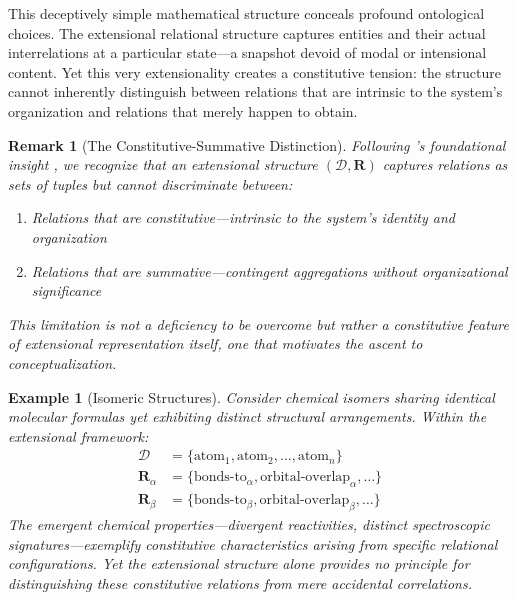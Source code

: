 \documentclass[12pt,a4paper]{article}
\newtheorem{remark}[definition]{Remark}
\newtheorem{example}[definition]{Example}
\newcommand{\domain}{\mathcal{D}}
\begin{document}
This deceptively simple mathematical structure conceals profound ontological choices. The extensional relational structure captures entities and their actual interrelations at a particular state---a snapshot devoid of modal or intensional content. Yet this very extensionality creates a constitutive tension: the structure cannot inherently distinguish between relations that are intrinsic to the system's organization and relations that merely happen to obtain.

\begin{remark}[The Constitutive-Summative Distinction]
Following \citeauthor{bertalanffy1968}'s foundational insight \citep{bertalanffy1968}, we recognize that an extensional structure $(\domain, \mathbf{R})$ captures relations as sets of tuples but cannot discriminate between:
\begin{enumerate}
    \item Relations that are \emph{constitutive}---intrinsic to the system's identity and organization
    \item Relations that are \emph{summative}---contingent aggregations without organizational significance
\end{enumerate}
This limitation is not a deficiency to be overcome but rather a constitutive feature of extensional representation itself, one that motivates the ascent to conceptualization.
\end{remark}

\begin{example}[Isomeric Structures]
Consider chemical isomers sharing identical molecular formulas yet exhibiting distinct structural arrangements. Within the extensional framework:
\begin{align*}
    \domain &= \{\text{atom}_1, \text{atom}_2, \ldots, \text{atom}_n\}\\
    \mathbf{R}_{\alpha} &= \{\text{bonds-to}_\alpha, \text{orbital-overlap}_\alpha, \ldots\}\\
    \mathbf{R}_{\beta} &= \{\text{bonds-to}_\beta, \text{orbital-overlap}_\beta, \ldots\}
\end{align*}
The emergent chemical properties---divergent reactivities, distinct spectroscopic signatures---exemplify constitutive characteristics arising from specific relational configurations. Yet the extensional structure alone provides no principle for distinguishing these constitutive relations from mere accidental correlations.
\end{example}

\end{document}
